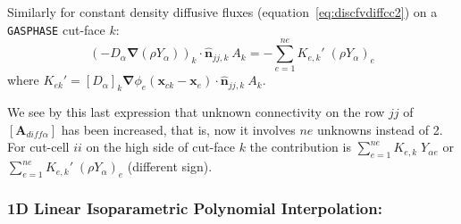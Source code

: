 \documentclass[12pt]{article}
\begin{document}
Similarly for constant density diffusive fluxes (equation~\eqref{eq:discfvdiffcc2}) on a \texttt{GASPHASE} cut-face $k$:
%
\begin{equation}
   \left( - D_\alpha \boldsymbol{\nabla} \left( \rho Y_\alpha \right) \right)_k \cdot \hat{\mathbf{n}}_{jj,k} \: A_k = - \sum^{ne}_{e=1} K_{e,k}' \; \left( \rho Y_{\alpha} \right)_e \label{eq:kekdiff2}
\end{equation} 
%
where $K_{ek}' = [D_\alpha]_k \boldsymbol{\nabla} \phi_e(\mathbf{x}_{ck}-\mathbf{x}_e) \cdot \hat{\mathbf{n}}_{jj,k} \: A_k$.

We see by this last expression that unknown connectivity on the row $jj$ of $\left[ \mathbf{A}_{diff \alpha} \right]$ has been increased, that is, now it involves $ne$ unknowns instead of 2. For cut-cell $ii$ on the high side of cut-face $k$ the contribution is $\sum^{ne}_{e=1} K_{e,k} \; Y_{\alpha e}$ or  $\sum^{ne}_{e=1} K_{e,k}' \; \left( \rho Y_{\alpha} \right)_e$ (different sign).


\subsubsection*{1D Linear Isoparametric Polynomial Interpolation:}
\end{document}
